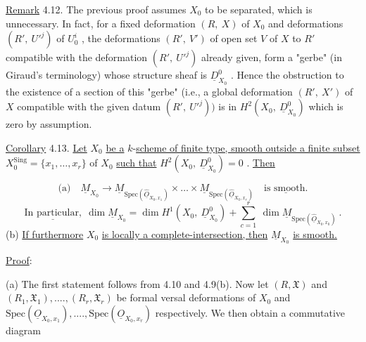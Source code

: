 \underline{Remark} 4.12.  The previous proof assumes  $X_0$  to be separated, which is unnecessary. In fact, for a fixed deformation  $(R,\ X)$  of  $X_0$  and deformations  $(R',\ U'^j)$  of $U_0^i$ , the deformations  $(R',\ V')$  of open set  $V$  of  $X$  to  $R'$  compatible with the deformation  $(R',\ U'^j)$  already given, form a  "gerbe"  (in Giraud's terminology) whose structure sheaf is  $\underline{D}^0_{X_0}$ . Hence the obstruction to the existence of a section of this  "gerbe"  (i.e., a global deformation  $(R',\ X')$  of  $X$  compatible with the given datum  $(R',\ U'^j))$  is in $H^2(X_0,\ \underline{D}^0_{X_0})$  which is zero by assumption.

\underline{Corollary} 4.13.  \underline{Let}  $X_0$  \underline{be a} $k$-\underline{scheme of finite type, smooth outside a finite subset}  $X_0^{\mathrm{Sing}} = \{x_1,\dots,x_r\}$  of  $X_0$  \underline{such that}  $H^2(X_0,\ \underline{D}^0_{X_0}) = 0$ . \underline{Then}

$$\text{(a)}\quad \underline{M}_{X_0} \to \underline{M}_{\mathrm{Spec}(\widehat{\underline{O}}_{X_0,x_1})} \times\dots\times \underline{M}_{\mathrm{Spec}(\widehat{\underline{O}}_{X_0,x_r})}\quad \underline{\text{is smooth.}}$$
$$\underline{\text{In particular,}}\ \ \dim \underline{M}_{X_0} = \dim H^1(X_0,\ \underline{D}^0_{X_0}) + \sum_{c=1}^{r} \ \dim \underline{M}_{\mathrm{Spec}(\widehat{\underline{O}}_{X_0,x_0})}\ .$$
(b)  \underline{If furthermore}  $X_0$  \underline{is locally a complete-intersection, then}  $\underline{M}_{X_0}$ \underline{is smooth.}


\underline{Proof}:

(a)  The first statement follows from 4.10 and 4.9(b). Now let  $(R, \mathfrak{X})$  and  $(R_1, \mathfrak{X}_1),....,(R_r, \mathfrak{X}_r)$  be formal versal deformations of  $X_0$  and  $\mathrm{Spec}(\underline{O}_{X_0,x_1}),....,\mathrm{Spec}(\underline{O}_{X_0,x_r})$  respectively. We then obtain a commutative diagram

